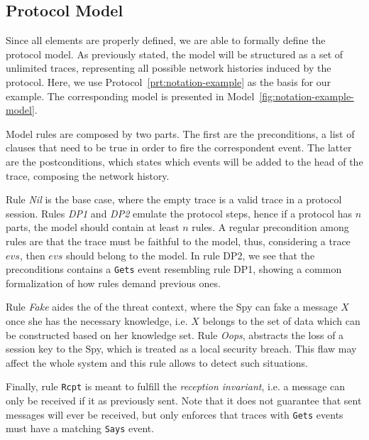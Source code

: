 \subsection{Protocol Model}
Since all elements are properly defined, we are able to formally define the protocol model. As previously stated, the model will be structured as a set of unlimited traces, representing all possible network histories induced by the protocol. Here, we use Protocol~\ref{prt:notation-example} as the basis for our example. The corresponding model is presented in Model~\ref{fig:notation-example-model}.

Model rules are composed by two parts. The first are the preconditions, a list of clauses that need to be true in order to fire the correspondent event. The latter are the postconditions, which states which events will be added to the head of the trace, composing the network history.

Rule \textit{Nil} is the base case, where the empty trace is a valid trace in a protocol session. Rules \textit{DP1} and \textit{DP2} emulate the protocol steps, hence if a protocol has $n$ parts, the model should contain at least $n$ rules. A regular precondition among rules are that the trace must be faithful to the model, thus, considering a trace $evs$, then $evs$ should belong to the model. In rule DP2, we see that the preconditions contains a \texttt{Gets} event resembling rule DP1, showing a common formalization of how rules demand previous ones.

Rule \textit{Fake} aides the of the threat context, where the Spy can fake a message $X$ once she has the necessary knowledge, i.e. $X$ belongs to the set of data which can be constructed based on her knowledge set. Rule \textit{Oops}, abstracts the loss of a session key to the Spy, which is treated as a local security breach. This flaw may affect the whole system and this rule allows to detect such situations.

Finally, rule \texttt{Rcpt} is meant to fulfill the \textit{reception invariant}, i.e. a message can only be received if it as previously sent. Note that it does not guarantee that sent messages will ever be received, but only enforces that traces with \texttt{Gets} events must have a matching \texttt{Says} event.

